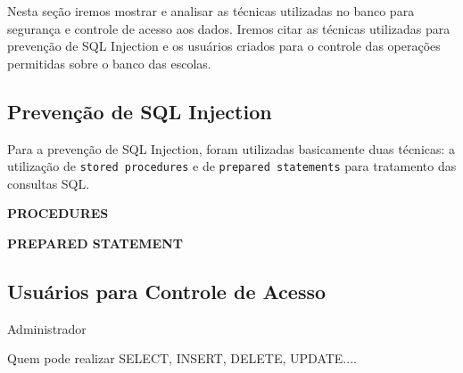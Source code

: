 \documentclass[12pt,a4paper]{article}
\begin{document}
Nesta seção iremos mostrar e analisar as técnicas utilizadas no banco para segurança e controle de acesso aos dados. Iremos citar as técnicas utilizadas para prevenção de SQL Injection e os usuários criados para o controle das operações permitidas sobre o banco das escolas.

\subsection{Prevenção de SQL Injection}

Para a prevenção de SQL Injection, foram utilizadas basicamente duas técnicas: a utilização de \texttt{stored procedures} e de \texttt{prepared statements} para tratamento das consultas SQL.

\begin{flushleft}
\textbf{PROCEDURES}\\
\end{flushleft}



\begin{flushleft}
\textbf{PREPARED STATEMENT}\\
\end{flushleft}


\subsection{Usuários para Controle de Acesso}

Administrador

Quem pode realizar SELECT, INSERT, DELETE, UPDATE....
\end{document}
